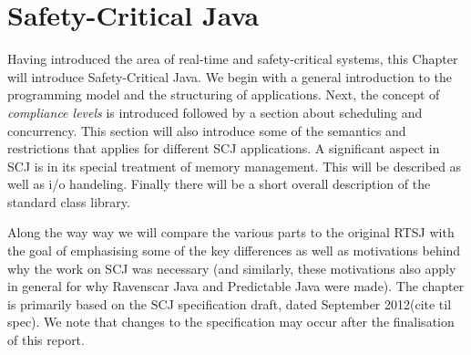 \chapter{Safety-Critical Java}
\label{chapter:scj}
Having introduced the area of real-time and safety-critical systems, this Chapter will introduce Safety-Critical Java. We begin with a general introduction to the programming model and the structuring of applications. Next, the concept of \textit{compliance levels} is introduced followed by a section about scheduling and concurrency. This section will also introduce some of the semantics and restrictions that applies for different SCJ applications. A significant aspect in SCJ is in its special treatment of memory management. This will be described as well as i/o handeling. Finally there will be a short overall description of the standard class library. 

Along the way way we will compare the various parts to the original RTSJ with the goal of emphasising some of the key differences as well as motivations behind why the work on SCJ was necessary (and similarly, these motivations also apply in general for why Ravenscar Java and Predictable Java were made). The chapter is primarily based on the SCJ specification draft, dated September 2012(cite til spec). We note that changes to the specification may occur after the finalisation of this report.